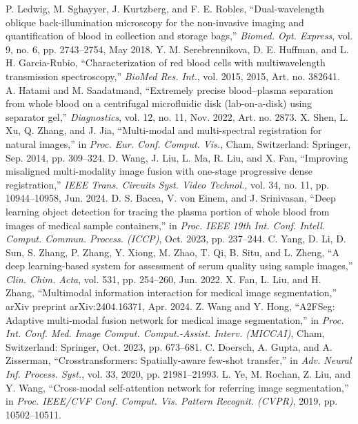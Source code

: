 \begin{thebibliography}{00}
 P. Ledwig, M. Sghayyer, J. Kurtzberg, and F. E. Robles, ``Dual-wavelength oblique back-illumination microscopy for the non-invasive imaging and quantification of blood in collection and storage bags,'' {\it Biomed. Opt. Express}, vol. 9, no. 6, pp. 2743--2754, May 2018.
 Y. M. Serebrennikova, D. E. Huffman, and L. H. Garcia-Rubio, ``Characterization of red blood cells with multiwavelength transmission spectroscopy,'' {\it BioMed Res. Int.}, vol. 2015, 2015, Art. no. 382641.
 A. Hatami and M. Saadatmand, ``Extremely precise blood–plasma separation from whole blood on a centrifugal microfluidic disk (lab-on-a-disk) using separator gel,'' {\it Diagnostics}, vol. 12, no. 11, Nov. 2022, Art. no. 2873.
 X. Shen, L. Xu, Q. Zhang, and J. Jia, ``Multi-modal and multi-spectral registration for natural images,'' in {\it Proc. Eur. Conf. Comput. Vis.}, Cham, Switzerland: Springer, Sep. 2014, pp. 309--324.
 D. Wang, J. Liu, L. Ma, R. Liu, and X. Fan, ``Improving misaligned multi-modality image fusion with one-stage progressive dense registration,'' {\it IEEE Trans. Circuits Syst. Video Technol.}, vol. 34, no. 11, pp. 10944--10958, Jun. 2024.
 D. S. Bacea, V. von Einem, and J. Srinivasan, ``Deep learning object detection for tracing the plasma portion of whole blood from images of medical sample containers,'' in {\it Proc. IEEE 19th Int. Conf. Intell. Comput. Commun. Process. (ICCP)}, Oct. 2023, pp. 237--244.
 C. Yang, D. Li, D. Sun, S. Zhang, P. Zhang, Y. Xiong, M. Zhao, T. Qi, B. Situ, and L. Zheng, ``A deep learning-based system for assessment of serum quality using sample images,'' {\it Clin. Chim. Acta}, vol. 531, pp. 254--260, Jun. 2022.
 X. Fan, L. Liu, and H. Zhang, ``Multimodal information interaction for medical image segmentation,'' arXiv preprint arXiv:2404.16371, Apr. 2024.
 Z. Wang and Y. Hong, ``A2FSeg: Adaptive multi-modal fusion network for medical image segmentation,'' in {\it Proc. Int. Conf. Med. Image Comput. Comput.-Assist. Interv. (MICCAI)}, Cham, Switzerland: Springer, Oct. 2023, pp. 673--681.
 C. Doersch, A. Gupta, and A. Zisserman, ``Crosstransformers: Spatially-aware few-shot transfer,'' in {\it Adv. Neural Inf. Process. Syst.}, vol. 33, 2020, pp. 21981--21993.
 L. Ye, M. Rochan, Z. Liu, and Y. Wang, ``Cross-modal self-attention network for referring image segmentation,'' in {\it Proc. IEEE/CVF Conf. Comput. Vis. Pattern Recognit. (CVPR)}, 2019, pp. 10502--10511.

\end{thebibliography}
